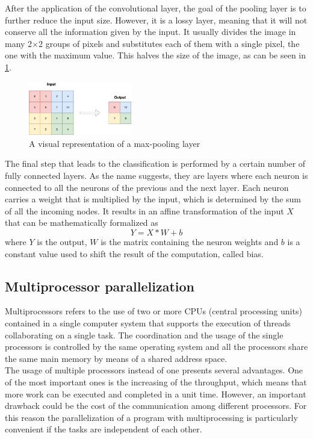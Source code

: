 \documentclass{usiinftr}
\begin{document}
\noindent
After the application of the convolutional layer, the goal of the pooling layer  is to further reduce the input size. However, it  is a lossy layer, meaning that it will not conserve all the information given by the input.
It usually divides the image in many 2$\times$2 groups of pixels and substitutes each of them with a single pixel, the one with the maximum  value. This halves the size of the image, as can be seen in \ref{fig:12}.
\begin{figure}[H]
	\centering
	\includegraphics[width=0.4\textwidth]{img/maxpool}
	\caption{A visual representation of a max-pooling layer}
	\label{fig:12}
\end{figure}
\newpage
\noindent
The final step that leads to the classification is performed by a certain number of fully connected layers. As the name suggests, they are layers where each neuron is connected to all the neurons of the previous and the next layer. Each neuron carries a weight that is multiplied by the input, which is determined by the sum of all the incoming nodes. It results in an affine transformation of the input $X$ that can be mathematically formalized as
$$Y=X*W+b$$
where $Y$ is the output, $W$ is the matrix containing the neuron weights and $b$ is a constant value used to shift the result of the computation, called bias. 



\subsection{Multiprocessor parallelization}
Multiprocessors refers to the use of two or more CPUs (central processing units) contained in a single computer system that supports the execution of threads collaborating on a single task. The coordination and the usage of the single processors is controlled by the same operating system and all the processors share the same main memory by means of a shared address space.  \\
The usage of multiple processors instead of one presents several advantages. One of the most important ones is the increasing of the  throughput, which means that more work can be executed and completed in a unit time. However, an important drawback could be the cost of the communication among different processors. For this reason the parallelization of a program with multiprocessing is particularly convenient if the tasks are independent of each other.
\end{document}
